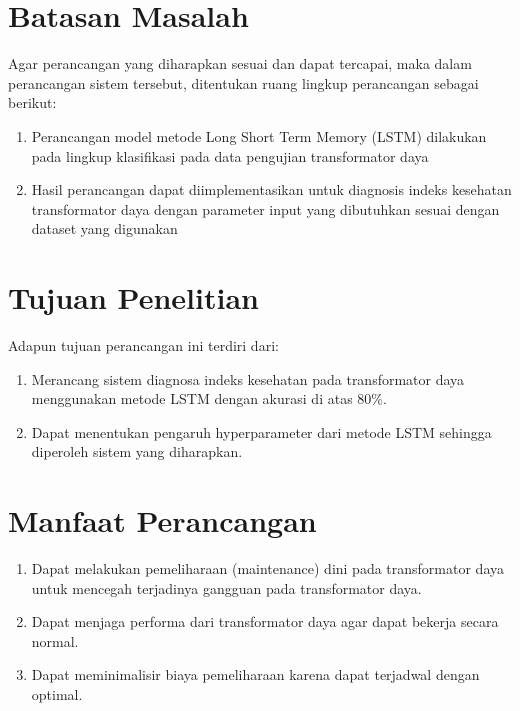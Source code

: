 \section{Batasan Masalah}
Agar perancangan yang diharapkan sesuai dan dapat tercapai, maka dalam perancangan sistem tersebut, ditentukan ruang lingkup perancangan sebagai berikut:
\begin{enumerate}
	\item Perancangan model metode Long Short Term Memory (LSTM) dilakukan pada lingkup klasifikasi pada data pengujian transformator daya
	\item Hasil perancangan dapat diimplementasikan untuk diagnosis indeks kesehatan transformator daya dengan parameter input yang dibutuhkan sesuai dengan dataset yang digunakan
\end{enumerate}

\section{Tujuan Penelitian}
Adapun tujuan perancangan ini terdiri dari:
\begin{enumerate}
	\item Merancang sistem diagnosa indeks kesehatan pada transformator daya menggunakan metode LSTM dengan akurasi di atas 80\%.
	\item Dapat menentukan pengaruh hyperparameter dari metode LSTM sehingga diperoleh sistem yang diharapkan.
\end{enumerate}


\section{Manfaat Perancangan}
\begin{enumerate}
	\item Dapat melakukan pemeliharaan (maintenance) dini pada transformator daya untuk mencegah terjadinya gangguan pada transformator daya.
	\item Dapat menjaga performa dari transformator daya agar dapat bekerja secara normal.
	\item Dapat meminimalisir biaya pemeliharaan karena dapat terjadwal dengan optimal.
\end{enumerate}


